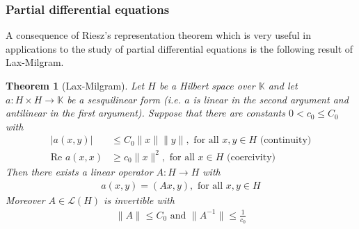 \documentclass[11pt,a4paper]{article}
\newtheorem{thm}{Theorem}[section]
\theoremstyle{definition}
\begin{document}
\subsubsection{Partial differential equations}
A consequence of Riesz's representation theorem which is very useful in applications to the study of partial differential equations is the following result of Lax-Milgram.
\begin{thm}[Lax-Milgram] Let $H$ be a Hilbert space over $\mathbb{K}$ and let $a: H \times H \to \mathbb{K}$ be a sesquilinear form (i.e. $a$ is linear in the second argument and antilinear in the first argument). Suppose that there are constants $0 < c_0 \leq C_0$ with 
\begin{align*}
|a(x,y)| &\leq C_0 \| x \| \|y \|, \text{ for all } x,y \in H \text{ (continuity)} \\
\text{Re } a(x,x) &\geq c_0 \|x\|^2, \text{ for all } x \in H \text{ (coercivity)} 
\end{align*}
Then there exists a linear operator $A: H \to H$ with
\begin{align*}
a(x,y) = (Ax,y), \text{ for all } x,y \in H
\end{align*}
Moreover $A \in \mathcal{L}(H)$ is invertible with 
\begin{align*}
\|A\| \leq C_0 \text{ and } \|A^{-1} \| \leq \frac{1}{c_0}
\end{align*}
\end{thm}
\end{document}
